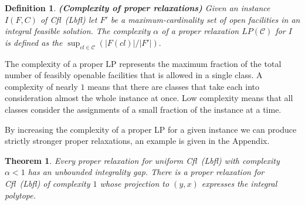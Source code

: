 \documentclass[11pt]{article}
\newtheorem{theorem}{Theorem}[section]
\newtheorem{definition}{Definition}[section]
\newcommand{\lbfl}{{\sc Lbfl}}
\newcommand{\cfl}{{\sc Cfl}}
\begin{document}
\vspace*{-0.2cm}
\begin{definition} {\bf (Complexity of proper relaxations)}  \label{def:complexity}
Given an instance $I(F,C)$ of \cfl\ (\lbfl\/)
let $F'$ be  a 
maximum-cardinality set  of open facilities in an integral feasible
solution. The {\em complexity $\alpha$} of a  proper
relaxation $LP(\mathcal{C})$ for $I$ is
defined as the 
   $\sup_{cl \in \mathcal{C}} ({|F(cl)|}/{|F'|}).$
\end{definition}

 \vspace*{-0.09cm}

The  complexity of  a  proper LP  represents the  maximum
fraction of the  total number of feasibly openable  facilities that is
allowed in a single class. 
A complexity of nearly $1$
means that there are classes that take each 
into consideration almost the whole instance
at once. Low complexity means that all classes consider
the assignments of a small fraction of the instance at a time.  
\iffalse ===========================
We remark
that    the   proper    LP    with   an    integral   polytope    from
Theorem~\ref{thm:gap1} has
a complexity of  $1$ since every class corresponds  by construction to
a feasible integral solution. 
(Clearly not every LP with complexity $1$ has an integrality gap of $1$
since it might contain weak classes together with the strong
ones.) 
============ \fi 
By increasing the complexity of a proper LP  for a given instance 
 we can produce strictly stronger 
proper relaxations, an example is given in the Appendix. 

\vspace*{-0.1cm}
\begin{theorem}\label{theorem:proper}
Every proper relaxation for uniform \cfl\ (\lbfl) with complexity $\alpha < 1$ has an
unbounded integrality gap. There is a proper  relaxation for
\cfl\ (\lbfl) of  complexity $1$  whose projection to $(y,x)$ expresses the integral polytope. 
\end{theorem}
\end{document}
